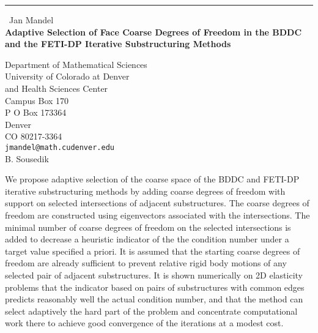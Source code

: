 \documentclass{report}
\begin{document}
\begin{center}
\rule{6in}{1pt} \
{\large Jan Mandel \\
{\bf Adaptive Selection of Face Coarse Degrees of Freedom in the BDDC and the FETI-DP Iterative Substructuring Methods}}

Department of Mathematical Sciences \\ University of Colorado at Denver \\ and Health Sciences Center \\ Campus Box 170 \\ P O Box 173364 \\ Denver \\ CO 80217-3364
\\
{\tt jmandel@math.cudenver.edu}\\
B. Sousedik\end{center}

We propose adaptive selection of the coarse space of the BDDC and
FETI-DP iterative substructuring methods by adding coarse degrees
of freedom with support on selected intersections of
adjacent substructures. The coarse degrees of freedom are constructed using
eigenvectors associated with the intersections. The minimal number
of coarse degrees of freedom on the selected intersections is added to decrease
a heuristic indicator of the the condition number under a target
value specified a priori. It is assumed that the starting coarse
degrees of freedom are already sufficient to prevent relative rigid body motions
of any selected pair of adjacent substructures. It is shown
numerically on 2D elasticity problems that the indicator based on
pairs of substructures with common edges predicts reasonably well
the actual condition number, and that the method can select
adaptively the hard part of the problem and concentrate
computational work there to achieve good convergence of the
iterations at a modest cost.
\end{document}
